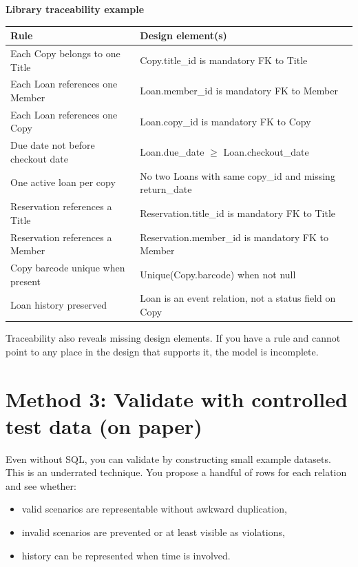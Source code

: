\begin{examplebox}
\textbf{Library traceability example}\\[4pt]
\begin{tabularx}{\textwidth}{@{}lX@{}}
\toprule
Rule & Design element(s) \\
\midrule
Each Copy belongs to one Title & Copy.title\_id is mandatory FK to Title \\
Each Loan references one Member & Loan.member\_id is mandatory FK to Member \\
Each Loan references one Copy & Loan.copy\_id is mandatory FK to Copy \\
Due date not before checkout date & Loan.due\_date \(\ge\) Loan.checkout\_date \\
One active loan per copy & No two Loans with same copy\_id and missing return\_date \\
Reservation references a Title & Reservation.title\_id is mandatory FK to Title \\
Reservation references a Member & Reservation.member\_id is mandatory FK to Member \\
Copy barcode unique when present & Unique(Copy.barcode) when not null \\
Loan history preserved & Loan is an event relation, not a status field on Copy \\
\bottomrule
\end{tabularx}
\end{examplebox}

Traceability also reveals missing design elements.
If you have a rule and cannot point to any place in the design that supports it, the model is incomplete.

\section{Method 3: Validate with controlled test data (on paper)}
Even without SQL, you can validate by constructing small example datasets.
This is an underrated technique.
You propose a handful of rows for each relation and see whether:
\begin{itemize}[leftmargin=*,nosep]
  \item valid scenarios are representable without awkward duplication,
  \item invalid scenarios are prevented or at least visible as violations,
  \item history can be represented when time is involved.
\end{itemize}

